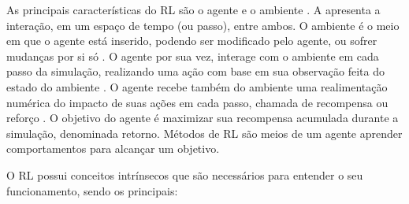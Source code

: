 As principais características do \acrshort{RL} são o agente e o ambiente \cite{machinelearning}. A  apresenta a interação, em um espaço de tempo (ou passo), entre ambos. O ambiente é o meio em que o agente está inserido, podendo ser modificado pelo agente, ou sofrer mudanças por si só \cite{rl_intro}. O agente por sua vez, interage com o ambiente em cada passo da simulação, realizando uma ação com base em sua observação feita do estado do ambiente \cite{rl_intro}. O agente recebe também do ambiente uma realimentação numérica do impacto de suas ações em cada passo, chamada de recompensa ou reforço \cite{modern_approach}. O objetivo do agente é maximizar sua recompensa acumulada durante a simulação, denominada retorno. Métodos de \acrshort{RL} são meios de um agente aprender comportamentos para alcançar um objetivo.

%

O \acrshort{RL} possui conceitos intrínsecos que são necessários para entender o seu funcionamento, sendo os principais:

